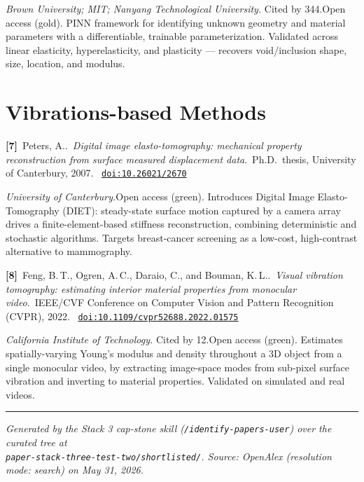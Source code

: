 \documentclass[11pt]{article}
\newcommand{\bibentry}[6]{%
  \noindent\textbf{[#1]}~#2.~\textit{#3}.~#4, #5.~%
  \href{https://doi.org/#6}{\texttt{doi:#6}}\par\vspace{6pt}
}
\begin{document}
\textit{Brown University; MIT; Nanyang Technological University.} Cited by 344.\quad Open access (gold). \quad
PINN framework for identifying unknown geometry and material parameters with a differentiable, trainable parameterization. Validated across linear elasticity, hyperelasticity, and plasticity --- recovers void/inclusion shape, size, location, and modulus.

\section{Vibrations-based Methods}

\bibentry{7}{Peters, A.}{Digital image elasto-tomography: mechanical property reconstruction from surface measured displacement data}{Ph.D.\ thesis, University of Canterbury}{2007}{10.26021/2670}

\textit{University of Canterbury.}\quad Open access (green). \quad
Introduces Digital Image Elasto-Tomography (DIET): steady-state surface motion captured by a camera array drives a finite-element-based stiffness reconstruction, combining deterministic and stochastic algorithms. Targets breast-cancer screening as a low-cost, high-contrast alternative to mammography.

\bibentry{8}{Feng, B.\,T., Ogren, A.\,C., Daraio, C., and Bouman, K.\,L.}{Visual vibration tomography: estimating interior material properties from monocular video}{IEEE/CVF Conference on Computer Vision and Pattern Recognition (CVPR)}{2022}{10.1109/cvpr52688.2022.01575}

\textit{California Institute of Technology.} Cited by 12.\quad Open access (green). \quad
Estimates spatially-varying Young's modulus and density throughout a 3D object from a single monocular video, by extracting image-space modes from sub-pixel surface vibration and inverting to material properties. Validated on simulated and real videos.

\vspace{2em}
\hrule
\vspace{0.5em}

{\footnotesize\itshape
Generated by the Stack 3 cap-stone skill (\texttt{/identify-papers-user}) over the curated tree at \\
\texttt{paper-stack-three-test-two/shortlisted/}. Source: OpenAlex (resolution mode: search) on May 31, 2026.
}
\end{document}
